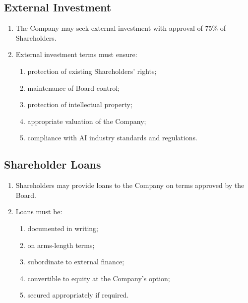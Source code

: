 \subsection{External Investment}
\begin{enumerate}[label=(\alph*)]
\item The Company may seek external investment with approval of 75\% of Shareholders.
\item External investment terms must ensure:
    \begin{enumerate}[label=(\roman*)]
    \item protection of existing Shareholders' rights;
    \item maintenance of Board control;
    \item protection of intellectual property;
    \item appropriate valuation of the Company;
    \item compliance with AI industry standards and regulations.
    \end{enumerate}
\end{enumerate}

\subsection{Shareholder Loans}
\begin{enumerate}[label=(\alph*)]
\item Shareholders may provide loans to the Company on terms approved by the Board.
\item Loans must be:
    \begin{enumerate}[label=(\roman*)]
    \item documented in writing;
    \item on arms-length terms;
    \item subordinate to external finance;
    \item convertible to equity at the Company's option;
    \item secured appropriately if required.
    \end{enumerate}
\end{enumerate} 